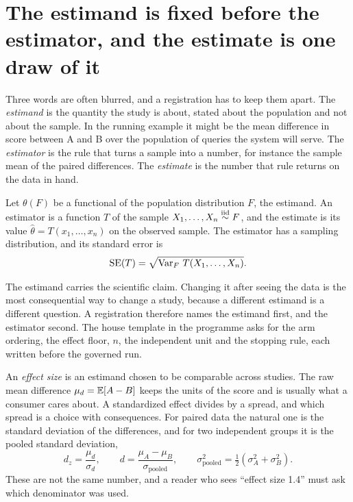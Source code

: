 \section{The estimand is fixed before the estimator, and the estimate is one draw of it}\label{sec:ch09:estimand}

Three words are often blurred, and a registration has to keep them apart. The \emph{estimand} is the quantity the study is about, stated about the population and not about the sample. In the running example it might be the mean difference in score between A and B over the population of queries the system will serve. The \emph{estimator} is the rule that turns a sample into a number, for instance the sample mean of the paired differences. The \emph{estimate} is the number that rule returns on the data in hand.
\begin{definition}\label{def:ch09:estimand}
Let $\theta(F)$ be a functional of the population distribution $F$, the estimand. An estimator is a function $T$ of the sample $X_1,\dots,X_n\overset{\text{iid}}{\sim} F$, and the estimate is its value $\hat\theta=T(x_1,\dots,x_n)$ on the observed sample. The estimator has a sampling distribution, and its standard error is
\begin{equation}
\operatorname{SE}(T)=\sqrt{\operatorname{Var}_F\,T(X_1,\dots,X_n)}.
\label{eq:ch09:se}
\end{equation}
\end{definition}
The estimand carries the scientific claim. Changing it after seeing the data is the most consequential way to change a study, because a different estimand is a different question. A registration therefore names the estimand first, and the estimator second. The house template in the programme asks for the arm ordering, the effect floor, $n$, the independent unit and the stopping rule, each written before the governed run.

An \emph{effect size} is an estimand chosen to be comparable across studies. The raw mean difference $\mu_d=\mathbb{E}[A-B]$ keeps the units of the score and is usually what a consumer cares about. A standardized effect divides by a spread, and which spread is a choice with consequences. For paired data the natural one is the standard deviation of the differences, and for two independent groups it is the pooled standard deviation,
\begin{equation}
d_z=\frac{\mu_d}{\sigma_d},\qquad d=\frac{\mu_A-\mu_B}{\sigma_{\text{pooled}}},\qquad \sigma^2_{\text{pooled}}=\tfrac12(\sigma_A^2+\sigma_B^2).
\label{eq:ch09:effect}
\end{equation}
These are not the same number, and a reader who sees ``effect size 1.4'' must ask which denominator was used.

